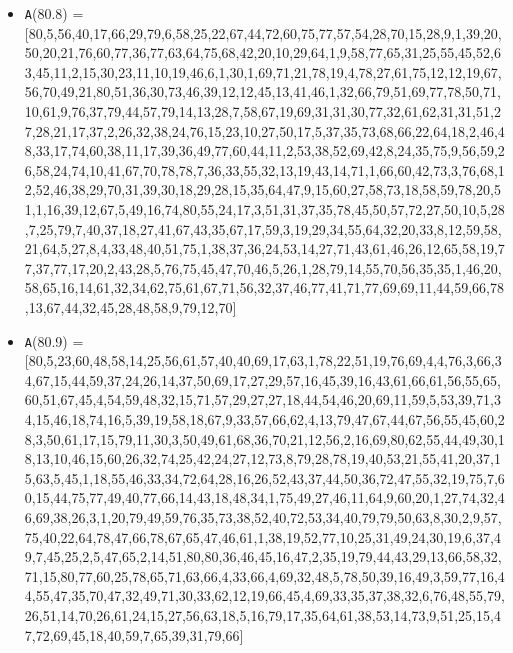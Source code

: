 \documentclass[runningheads,a4paper]{llncs}
\begin{document}
\begin{itemize}
	\item {\texttt A(80.8) = } [80,5,56,40,17,66,29,79,6,58,25,22,67,44,72,60,75,77,57,54,28,70,15,28,9,1,39,20,50,20,21,76,60,77,36,77,63,64,75,68,42,20,10,29,64,1,9,58,77,65,31,25,55,45,52,63,45,11,2,15,30,23,11,10,19,46,6,1,30,1,69,71,21,78,19,4,78,27,61,75,12,12,19,67,56,70,49,21,80,51,36,30,73,46,39,12,12,45,13,41,46,1,32,66,79,51,69,77,78,50,71,10,61,9,76,37,79,44,57,79,14,13,28,7,58,67,19,69,31,31,30,77,32,61,62,31,31,51,27,28,21,17,37,2,26,32,38,24,76,15,23,10,27,50,17,5,37,35,73,68,66,22,64,18,2,46,48,33,17,74,60,38,11,17,39,36,49,77,60,44,11,2,53,38,52,69,42,8,24,35,75,9,56,59,26,58,24,74,10,41,67,70,78,78,7,36,33,55,32,13,19,43,14,71,1,66,60,42,73,3,76,68,12,52,46,38,29,70,31,39,30,18,29,28,15,35,64,47,9,15,60,27,58,73,18,58,59,78,20,51,1,16,39,12,67,5,49,16,74,80,55,24,17,3,51,31,37,35,78,45,50,57,72,27,50,10,5,28,7,25,79,7,40,37,18,27,41,67,43,35,67,17,59,3,19,29,34,55,64,32,20,33,8,12,59,58,21,64,5,27,8,4,33,48,40,51,75,1,38,37,36,24,53,14,27,71,43,61,46,26,12,65,58,19,77,37,77,17,20,2,43,28,5,76,75,45,47,70,46,5,26,1,28,79,14,55,70,56,35,35,1,46,20,58,65,16,14,61,32,34,62,75,61,67,71,56,32,37,46,77,41,71,77,69,69,11,44,59,66,78,13,67,44,32,45,28,48,58,9,79,12,70]
	\item {\texttt A(80.9) = } [80,5,23,60,48,58,14,25,56,61,57,40,40,69,17,63,1,78,22,51,19,76,69,4,4,76,3,66,34,67,15,44,59,37,24,26,14,37,50,69,17,27,29,57,16,45,39,16,43,61,66,61,56,55,65,60,51,67,45,4,54,59,48,32,15,71,57,29,27,27,18,44,54,46,20,69,11,59,5,53,39,71,34,15,46,18,74,16,5,39,19,58,18,67,9,33,57,66,62,4,13,79,47,67,44,67,56,55,45,60,28,3,50,61,17,15,79,11,30,3,50,49,61,68,36,70,21,12,56,2,16,69,80,62,55,44,49,30,18,13,10,46,15,60,26,32,74,25,42,24,27,12,73,8,79,28,78,19,40,53,21,55,41,20,37,15,63,5,45,1,18,55,46,33,34,72,64,28,16,26,52,43,37,44,50,36,72,47,55,32,19,75,7,60,15,44,75,77,49,40,77,66,14,43,18,48,34,1,75,49,27,46,11,64,9,60,20,1,27,74,32,46,69,38,26,3,1,20,79,49,59,76,35,73,38,52,40,72,53,34,40,79,79,50,63,8,30,2,9,57,75,40,22,64,78,47,66,78,67,65,47,46,61,1,38,19,52,77,10,25,31,49,24,30,19,6,37,49,7,45,25,2,5,47,65,2,14,51,80,80,36,46,45,16,47,2,35,19,79,44,43,29,13,66,58,32,71,15,80,77,60,25,78,65,71,63,66,4,33,66,4,69,32,48,5,78,50,39,16,49,3,59,77,16,44,55,47,35,70,47,32,49,71,30,33,62,12,19,66,45,4,69,33,35,37,38,32,6,76,48,55,79,26,51,14,70,26,61,24,15,27,56,63,18,5,16,79,17,35,64,61,38,53,14,73,9,51,25,15,47,72,69,45,18,40,59,7,65,39,31,79,66]

\end{itemize}
\end{document}
